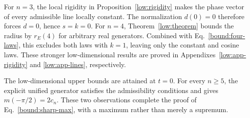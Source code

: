 For $n=3$, the local rigidity in Proposition~\ref{low:rigidity} makes the phase vector of every admissible line locally constant. The normalization $d(0)=0$ therefore forces $d=0$, hence $s=k=0$. For $n=4$, Theorem~\ref{low:theorem} bounds the radius by $r_E(4)$ for arbitrary real generators. Combined with Eq.~\eqref{bound:four-laws}, this excludes both laws with $k=1$, leaving only the constant and cosine laws. These stronger low-dimensional results are proved in Appendixes~\ref{low:app-rigidity} and \ref{low:app-lines}, respectively.

The low-dimensional upper bounds are attained at $t=0$.
For every $n\ge5$, the explicit unified generator satisfies the
admissibility conditions and gives $m(-\pi/2)=2c_n$.
These two observations complete the proof of
Eq.~\eqref{bound:sharp-max}, with a maximum rather than merely a
supremum.
